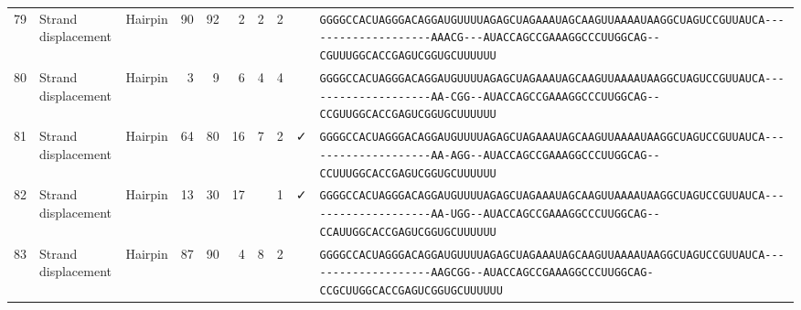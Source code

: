 \begin{tabular}{rllrrrrrcl}
 79 & Strand displacement & Hairpin & 90 & 92 & 2 & 2 & 2 &  &
 \color{ucsfdarkgrey}\verb|GGGGCCACUAGGGACAGGAU|\color{ucsforange}\verb|GUUUUA|\color{ucsfblue}\verb|GAGCUAGAAAUAGCAAGU|\color{ucsforange}\verb|UAAAAUAA|\color{ucsfnavy}\verb|GGCUAGUCCGU|\color{ucsforange}\verb|UAUCA|\color{ucsfteal}\verb|--------------------AAACG---|\color{ucsfpurple}\verb|AUACCAGCCGAAAGGCCCUUGGCAG|\color{ucsfteal}\verb|--CGUUU|\color{ucsforange}\verb|GGCACCGAGUCGGUGCUUUUUU| \\

 80 & Strand displacement & Hairpin & 3 & 9 & 6 & 4 & 4 &  &
 \color{ucsfdarkgrey}\verb|GGGGCCACUAGGGACAGGAU|\color{ucsforange}\verb|GUUUUA|\color{ucsfblue}\verb|GAGCUAGAAAUAGCAAGU|\color{ucsforange}\verb|UAAAAUAA|\color{ucsfnavy}\verb|GGCUAGUCCGU|\color{ucsforange}\verb|UAUCA|\color{ucsfteal}\verb|--------------------AA-CGG--|\color{ucsfpurple}\verb|AUACCAGCCGAAAGGCCCUUGGCAG|\color{ucsfteal}\verb|--CCGUU|\color{ucsforange}\verb|GGCACCGAGUCGGUGCUUUUUU| \\

 81 & Strand displacement & Hairpin & 64 & 80 & 16 & 7 & 2 & ✓ &
 \color{ucsfdarkgrey}\verb|GGGGCCACUAGGGACAGGAU|\color{ucsforange}\verb|GUUUUA|\color{ucsfblue}\verb|GAGCUAGAAAUAGCAAGU|\color{ucsforange}\verb|UAAAAUAA|\color{ucsfnavy}\verb|GGCUAGUCCGU|\color{ucsforange}\verb|UAUCA|\color{ucsfteal}\verb|--------------------AA-AGG--|\color{ucsfpurple}\verb|AUACCAGCCGAAAGGCCCUUGGCAG|\color{ucsfteal}\verb|--CCUUU|\color{ucsforange}\verb|GGCACCGAGUCGGUGCUUUUUU| \\

 82 & Strand displacement & Hairpin & 13 & 30 & 17 &  & 1 & ✓ &
 \color{ucsfdarkgrey}\verb|GGGGCCACUAGGGACAGGAU|\color{ucsforange}\verb|GUUUUA|\color{ucsfblue}\verb|GAGCUAGAAAUAGCAAGU|\color{ucsforange}\verb|UAAAAUAA|\color{ucsfnavy}\verb|GGCUAGUCCGU|\color{ucsforange}\verb|UAUCA|\color{ucsfteal}\verb|--------------------AA-UGG--|\color{ucsfpurple}\verb|AUACCAGCCGAAAGGCCCUUGGCAG|\color{ucsfteal}\verb|--CCAUU|\color{ucsforange}\verb|GGCACCGAGUCGGUGCUUUUUU| \\

 83 & Strand displacement & Hairpin & 87 & 90 & 4 & 8 & 2 &  &
 \color{ucsfdarkgrey}\verb|GGGGCCACUAGGGACAGGAU|\color{ucsforange}\verb|GUUUUA|\color{ucsfblue}\verb|GAGCUAGAAAUAGCAAGU|\color{ucsforange}\verb|UAAAAUAA|\color{ucsfnavy}\verb|GGCUAGUCCGU|\color{ucsforange}\verb|UAUCA|\color{ucsfteal}\verb|--------------------AAGCGG--|\color{ucsfpurple}\verb|AUACCAGCCGAAAGGCCCUUGGCAG|\color{ucsfteal}\verb|-CCGCUU|\color{ucsforange}\verb|GGCACCGAGUCGGUGCUUUUUU| \\


\end{tabular}

